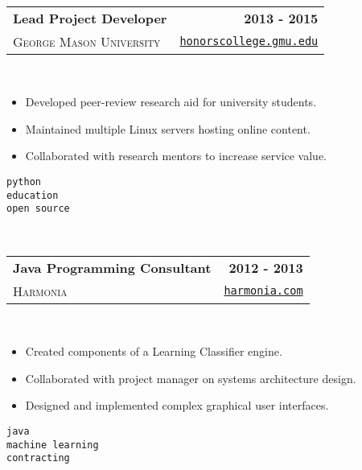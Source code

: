 \documentclass[10pt,letterpaper]{article}
\newenvironment{details}
{\begin{itemize}}
{\end{itemize}}
\begin{document}
  \hfill\\

  \noindent\begin{tabularx}{\textwidth}{@{}X r@{}}
    \textbf{Lead Project Developer} & \textbf{2013 - 2015} \\
    \textsc{George Mason University} & \texttt{\href{http://honorscollege.gmu.edu/collegeresearch}{honorscollege.gmu.edu}}
  \end{tabularx}
  \hfill\\
  \noindent\begin{minipage}[t]{\dimexpr.7\textwidth-.7\columnsep}
    \raggedright
    \begin{details}
    \item Developed peer-review research aid for university students.
    \item Maintained multiple Linux servers hosting online content.
    \item Collaborated with research mentors to increase service value.
    \end{details}
  \end{minipage}%
  \begin{minipage}[t]{\dimexpr.32\textwidth-.32\columnsep}
    \raggedleft
    \texttt{python} \\
    \texttt{education} \\
    \texttt{open source}
  \end{minipage}

  \hfill\\

  \noindent\begin{tabularx}{\textwidth}{@{}X r@{}}
    \textbf{Java Programming Consultant} & \textbf{2012 - 2013} \\
    \textsc{Harmonia} & \texttt{\href{https://harmonia.com}{harmonia.com}}
  \end{tabularx}
  \hfill\\
  \noindent\begin{minipage}[t]{\dimexpr.7\textwidth-.7\columnsep}
    \raggedright
    \begin{details}
    \item Created components of a Learning Classifier engine.
    \item Collaborated with project manager on systems architecture design.
    \item Designed and implemented complex graphical user interfaces.
    \end{details}
  \end{minipage}%
  \begin{minipage}[t]{\dimexpr.32\textwidth-.32\columnsep}
    \raggedleft
    \texttt{java} \\
    \texttt{machine learning} \\
    \texttt{contracting}
  \end{minipage}
\end{document}
